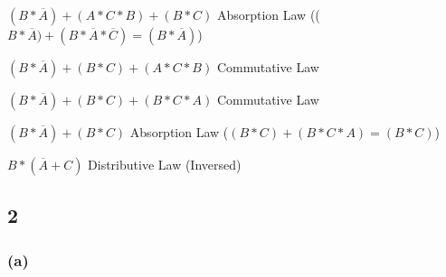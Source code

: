 \documentclass{article}
\newcommand{\boxedanswer}[1]{%

    \fbox{\large\textbf{#1}}%
}
\begin{document}
    $(B*\overline{A}) + (A*C*B) + (B*C)$ \hspace*{0.1in} Absorption Law (($B*\overline{A})+ (B*\overline{A}*\overline{C}) = (B*\overline{A})$)

    $(B*\overline{A}) + (B*C) + (A*C*B)$ \hspace*{0.1in} Commutative Law

    $(B*\overline{A}) + (B*C) + (B*C*A)$ \hspace*{0.1in} Commutative Law

    $(B*\overline{A}) + (B*C)$ \hspace*{0.1in} Absorption Law ($(B*C) + (B*C*A) = (B*C)$)

    $B*(\overline{A}+C)$ Distributive Law (Inversed)

    \vspace*{0.1in}

    \boxedanswer{$B*(\overline{A}+C)$}

    \subsection*{2}

    \subsubsection*{(a)}
    
\end{document}
